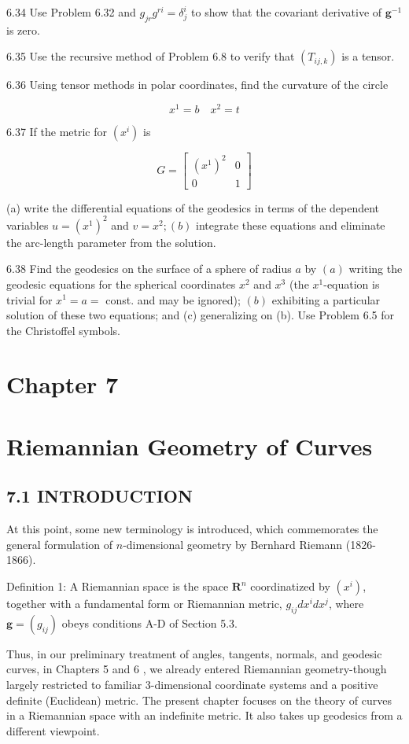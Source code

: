 \documentclass[10pt]{article}
\begin{document}
6.34 Use Problem 6.32 and $g_{j r} g^{r i}=\delta_{j}^{i}$ to show that the covariant derivative of $\mathbf{g}^{-1}$ is zero.

6.35 Use the recursive method of Problem 6.8 to verify that $\left(T_{i j, k}\right)$ is a tensor.

6.36 Using tensor methods in polar coordinates, find the curvature of the circle

$$
x^{1}=b \quad x^{2}=t
$$

6.37 If the metric for $\left(x^{i}\right)$ is

$$
G=\left[\begin{array}{cc}
\left(x^{1}\right)^{2} & 0 \\
0 & 1
\end{array}\right]
$$

(a) write the differential equations of the geodesics in terms of the dependent variables $u=\left(x^{1}\right)^{2}$ and $v=x^{2} ;(b)$ integrate these equations and eliminate the arc-length parameter from the solution.

6.38 Find the geodesics on the surface of a sphere of radius $a$ by $(a)$ writing the geodesic equations for the spherical coordinates $x^{2}$ and $x^{3}$ (the $x^{1}$-equation is trivial for $x^{1}=a=$ const. and may be ignored); $(b)$ exhibiting a particular solution of these two equations; and (c) generalizing on (b). Use Problem 6.5 for the Christoffel symbols.

\section*{Chapter 7}
\section*{Riemannian Geometry of Curves}
\subsection*{7.1 INTRODUCTION}
At this point, some new terminology is introduced, which commemorates the general formulation of $n$-dimensional geometry by Bernhard Riemann (1826-1866).

Definition 1: A Riemannian space is the space $\mathbf{R}^{n}$ coordinatized by $\left(x^{i}\right)$, together with a fundamental form or Riemannian metric, $g_{i j} d x^{i} d x^{j}$, where $\mathbf{g}=\left(g_{i j}\right)$ obeys conditions A-D of Section 5.3.

Thus, in our preliminary treatment of angles, tangents, normals, and geodesic curves, in Chapters 5 and 6 , we already entered Riemannian geometry-though largely restricted to familiar 3-dimensional coordinate systems and a positive definite (Euclidean) metric. The present chapter focuses on the theory of curves in a Riemannian space with an indefinite metric. It also takes up geodesics from a different viewpoint.
\end{document}
